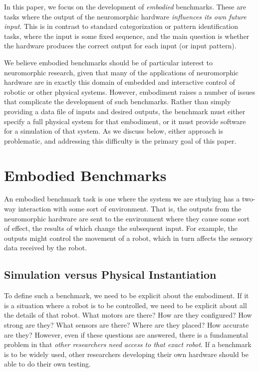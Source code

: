 \documentclass{frontiersSCNS} %
\begin{document}
In this paper, we focus on the development of \emph{embodied} benchmarks.
These are tasks where the output of the neuromorphic hardware \emph{influences
its own future input}.  This is in contrast to standard categorization or pattern
identification tasks, where the input is some fixed sequence, and the main
question is whether the hardware produces the correct output for each input
(or input pattern).

We believe embodied benchmarks should be of particular interest to
neuromorphic research, given that many of the applications of neuromorphic
hardware are in exactly this domain of embedded and interactive control
of robotic or other physical systems.  However, embodiment raises a number
of issues that complicate the development of such benchmarks.  Rather than
simply providing a data file of inputs and desired outputs, the benchmark
must either specify a full physical system for that embodiment, or it must 
provide software for a simulation of that system.  As we discuss below, either
approach is problematic, and addressing this difficulty is the primary goal of
this paper.


\section{Embodied Benchmarks}

An embodied benchmark task is one where the system we are studying has a 
two-way interaction with some sort of environment.  That is, the outputs from
the neuromorphic hardware are sent to the environment where they cause some
sort of effect, the results of which change the subsequent input.  For example,
the outputs might control the movement of a robot, which in turn affects the
sensory data received by the robot.

\subsection{Simulation versus Physical Instantiation}

To define such a benchmark, we need to be explicit about the embodiment.  If
it is a situation where a robot is to be controlled, we need to be explicit
about all the details of that robot.  What motors are there?  How are they
configured?  How strong are they?  What sensors are there?  Where are they
placed?  How accurate are they?  However, even if these questions are
answered, there is a fundamental problem in that \emph{other researchers
need access to that exact robot}.  If a benchmark is to be widely used, other
researchers developing their own hardware should be able to do their own 
testing.
\end{document}
